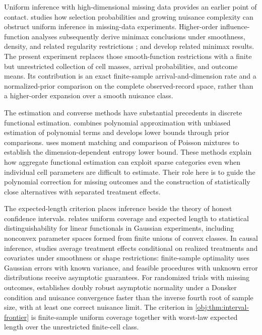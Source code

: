 Uniform inference with high-dimensional missing data provides an earlier point of contact. \citet[pp.~285--319]{Robins1997} studies how selection probabilities and growing nuisance complexity can obstruct uniform inference in missing-data experiments. Higher-order influence-function analyses subsequently derive minimax conclusions under smoothness, density, and related regularity restrictions \citep[pp.~335--421]{Robins2008}; \citet[pp.~1305--1321]{Robins2009} and \citet[pp.~1951--1987]{Robins2017} develop related minimax results. The present experiment replaces those smooth-function restrictions with a finite but unrestricted collection of cell masses, arrival probabilities, and outcome means. Its contribution is an exact finite-sample arrival-and-dimension rate and a normalized-prior comparison on the complete observed-record space, rather than a higher-order expansion over a smooth nuisance class.

The estimation and converse methods have substantial precedents in discrete functional estimation. \citet[Sections~III--IV]{JiaoVenkatHanWeissman2015} combines polynomial approximation with unbiased estimation of polynomial terms and develops lower bounds through prior comparisons. \citet[Proposition~3 and Appendix~B.2]{WuYang2016} uses moment matching and comparison of Poisson mixtures to establish the dimension-dependent entropy lower bound. These methods explain how aggregate functional estimation can exploit sparse categories even when individual cell parameters are difficult to estimate. Their role here is to guide the polynomial correction for missing outcomes and the construction of statistically close alternatives with separated treatment effects.

The expected-length criterion places inference beside the theory of honest confidence intervals. \citet[Theorem~1 and Section~5]{CaiLow2004} relates uniform coverage and expected length to statistical distinguishability for linear functionals in Gaussian experiments, including nonconvex parameter spaces formed from finite unions of convex classes. In causal inference, \citet{Armstrong2021} studies average treatment effects conditional on realized treatments and covariates under smoothness or shape restrictions: finite-sample optimality uses Gaussian errors with known variance, and feasible procedures with unknown error distributions receive asymptotic guarantees. For randomized trials with missing outcomes, \citet[Theorem~2 under Conditions~2--3]{DiazVanDerLaan2017} establishes doubly robust asymptotic normality under a Donsker condition and nuisance convergence faster than the inverse fourth root of sample size, with at least one correct nuisance limit. The criterion in \cref{obj:thm:interval-frontier} is finite-sample uniform coverage together with worst-law expected length over the unrestricted finite-cell class.

